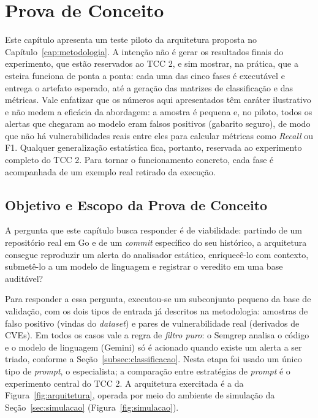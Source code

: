 \chapter{Prova de Conceito}
\label{cap:poc}

Este capítulo apresenta um teste piloto da arquitetura proposta no Capítulo~\ref{cap:metodologia}. A intenção não é gerar os resultados finais do experimento, que estão reservados ao TCC 2, e sim mostrar, na prática, que a esteira funciona de ponta a ponta: cada uma das cinco fases é executável e entrega o artefato esperado, até a geração das matrizes de classificação e das métricas. Vale enfatizar que os números aqui apresentados têm caráter ilustrativo e não medem a eficácia da abordagem: a amostra é pequena e, no piloto, todos os alertas que chegaram ao modelo eram falsos positivos (gabarito seguro), de modo que não há vulnerabilidades reais entre eles para calcular métricas como \textit{Recall} ou F1. Qualquer generalização estatística fica, portanto, reservada ao experimento completo do TCC 2. Para tornar o funcionamento concreto, cada fase é acompanhada de um exemplo real retirado da execução.

\section{Objetivo e Escopo da Prova de Conceito}

A pergunta que este capítulo busca responder é de viabilidade: partindo de um repositório real em Go e de um \textit{commit} específico do seu histórico, a arquitetura consegue reproduzir um alerta do analisador estático, enriquecê-lo com contexto, submetê-lo a um modelo de linguagem e registrar o veredito em uma base auditável?

Para responder a essa pergunta, executou-se um subconjunto pequeno da base de validação, com os dois tipos de entrada já descritos na metodologia: amostras de falso positivo (vindas do \textit{dataset}) e pares de vulnerabilidade real (derivados de CVEs). Em todos os casos vale a regra de \textit{filtro puro}: o Semgrep analisa o código e o modelo de linguagem (Gemini) só é acionado quando existe um alerta a ser triado, conforme a Seção~\ref{subsec:classificacao}. Nesta etapa foi usado um único tipo de \textit{prompt}, o especialista; a comparação entre estratégias de \textit{prompt} é o experimento central do TCC 2. A arquitetura exercitada é a da Figura~\ref{fig:arquitetura}, operada por meio do ambiente de simulação da Seção~\ref{sec:simulacao} (Figura~\ref{fig:simulacao}).

